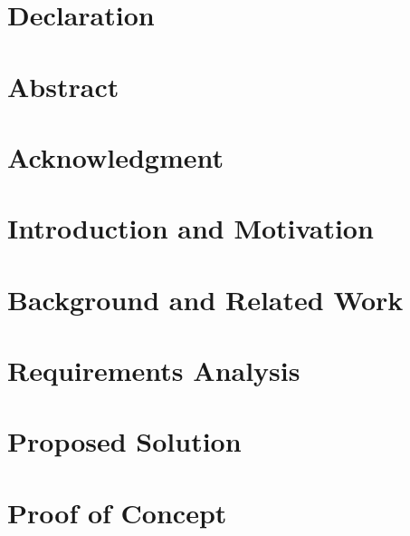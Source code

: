 \documentclass[12pt]{article}
\begin{document}



\section*{Declaration}

\newpage

\section*{Abstract}

\newpage

\section*{Acknowledgment}

\newpage

\tableofcontents
\newpage

\listoffigures
{}
\listoftables
\newpage


\section{Introduction and Motivation}


\section{Background and Related Work}


\section{Requirements Analysis}


\section{Proposed Solution}


\section{Proof of Concept}

\end{document}
